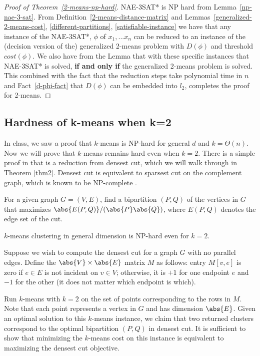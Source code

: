 \begin{proof}[Proof of Theorem~\ref{2-means-np-hard}]
NAE-3SAT* is NP hard from Lemma~\ref{np-nae-3-sat}.  From
Definition~\ref{2-means-distance-matrix} and
Lemmas~\ref{generalized-2-means-cost}, \ref{different-partitions},
\ref{satisfiable-instance} we have that any instance of the NAE-3SAT*,
$\phi$ of $x_1,...x_n$ can be reduced to an instance of the (decision
version of the) generalized 2-means problem with $D(\phi)$ and
threshold $cost(\phi)$.  We also have from the Lemma that with these
specific instances that NAE-3SAT* is solved, \textbf{if and only if}
the generalized 2-means problem is solved.  This combined with the
fact that the reduction steps take polynomial time in $n$ and
Fact~\ref{d-phi-fact} that $D(\phi)$ can be embedded into $l_2$,
completes the proof for 2-means. 
\end{proof}

\subsection{Hardness of k-means when k=2}
In class, we saw a proof that $k$-means is NP-hard for general $d$ and $k=\Theta(n)$. Now we will prove that $k$-means remains hard even when $k=2$. There is a simple proof in \cite{deshpande} that is a reduction from densest cut, which we will walk through in Theorem \ref{thm2}. Densest cut is equivalent to sparsest cut on the complement graph, which is known to be NP-complete \cite{matula1990sparsest}.

\begin{definition}
    For a given graph $G=(V,E)$, find a bipartition $(P,Q)$ of the vertices in $G$ that maximizes $\abs{E(P,Q)}/(\abs{P}\abs{Q})$, where $E(P,Q)$ denotes the edge set of the cut.
\end{definition}

\begin{theorem}\label{thm2}
    $k$-means clustering in general dimension is NP-hard even for $k=2$.
\end{theorem}

Suppose we wish to compute the densest cut for a graph $G$ with no parallel edges. Define the $\abs{V}\times\abs{E}$ matrix $M$ as follows: entry $M[v,e]$ is zero if $e\in E$ is not incident on $v\in V$; otherwise, it is $+1$ for one endpoint $e$ and $-1$ for the other (it does not matter which endpoint is which).

Run $k$-means with $k=2$ on the set of points corresponding to the rows in $M$. Note that each point represents a vertex in $G$ and has dimension $\abs{E}$. Given an optimal solution to this $k$-means instance, we claim that two returned clusters correspond to the optimal bipartition $(P,Q)$ in densest cut. It is sufficient to show that minimizing the $k$-means cost on this instance is equivalent to maximizing the densest cut objective.

